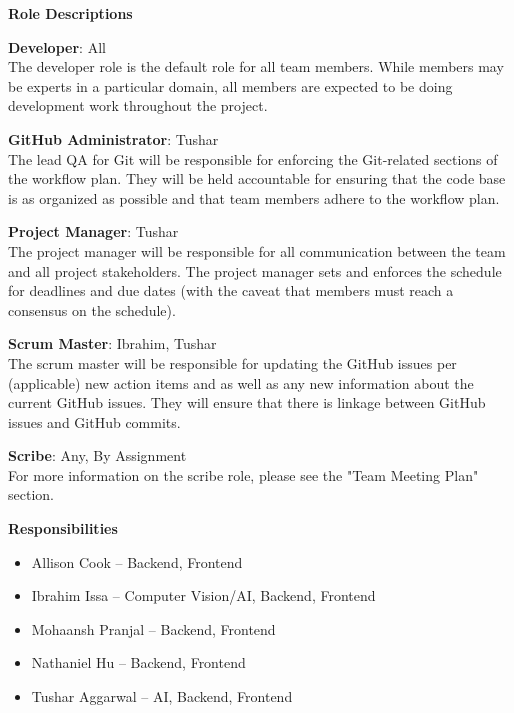 \documentclass{article}
\begin{document}
\noindent \textbf{Role Descriptions}
\begin{itemize}
\begin{item} 
\textbf{Developer}: All \\
The developer role is the default role for all team members. While members may be experts in a particular domain, all members are expected to be doing development work throughout the project.
\end{item}
\begin{item}
\textbf{GitHub Administrator}: Tushar \\
The lead QA for Git will be responsible for enforcing the Git-related sections of the workflow plan. They will be held accountable for ensuring that the code base is as organized as possible and that team members adhere to the workflow plan.
\end{item}
\begin{item}
\textbf{Project Manager}: Tushar \\
The project manager will be responsible for all communication between the team and all project stakeholders. The project manager sets and enforces the schedule for deadlines and due dates (with the caveat that members must reach a consensus on the schedule).
\end{item}
\begin{item}
\textbf{Scrum Master}: Ibrahim, Tushar \\
The scrum master will be responsible for updating the GitHub issues per (applicable) new action items and as well as any new information about the current GitHub issues. They will ensure that there is linkage between GitHub issues and GitHub commits. 
\end{item}
\begin{item} 
\textbf{Scribe}: Any, By Assignment \\
For more information on the scribe role, please see the "Team Meeting Plan" section.
\end{item}
\end{itemize}

\noindent \textbf{Responsibilities}
\begin{itemize}
\item Allison Cook – Backend, Frontend 
\item Ibrahim Issa – Computer Vision/AI, Backend, Frontend 
\item Mohaansh Pranjal – Backend, Frontend 
\item Nathaniel Hu – Backend, Frontend 
\item Tushar Aggarwal – AI, Backend, Frontend
\end{itemize}
\end{document}
